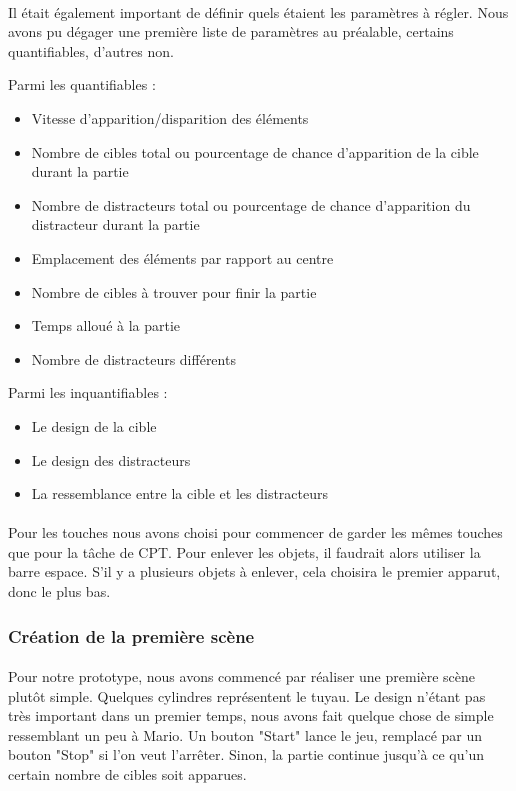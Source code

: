 \paragraph{}Il était également important de définir quels étaient les paramètres à régler. Nous avons pu dégager une première liste de paramètres au préalable, certains
quantifiables, d'autres non.

Parmi les quantifiables :
\begin{itemize}
    \item Vitesse d'apparition/disparition des éléments
    \item Nombre de cibles total ou pourcentage de chance d'apparition de la cible durant la partie
    \item Nombre de distracteurs total ou pourcentage de chance d'apparition du distracteur durant la partie
    \item Emplacement des éléments par rapport au centre
    \item Nombre de cibles à trouver pour finir la partie
    \item Temps alloué à la partie
    \item Nombre de distracteurs différents\\
\end{itemize}
Parmi les inquantifiables :
\begin{itemize}
    \item Le design de la cible
    \item Le design des distracteurs
    \item La ressemblance entre la cible et les distracteurs
\end{itemize}

\paragraph{}Pour les touches nous avons choisi pour commencer de garder les mêmes touches que pour la tâche de CPT. Pour enlever les objets, il faudrait alors utiliser la barre espace.
S'il y a plusieurs objets à enlever, cela choisira le premier apparut, donc le plus bas.

\subsubsection{Création de la première scène}

\paragraph{}Pour notre prototype, nous avons commencé par réaliser une première scène plutôt simple. Quelques cylindres représentent le tuyau. Le design n'étant pas très important
dans un premier temps, nous avons fait quelque chose de simple ressemblant un peu à Mario. Un bouton "Start" lance le jeu, remplacé par un bouton "Stop" si l'on veut l'arrêter. Sinon,
la partie continue jusqu'à ce qu'un certain nombre de cibles soit apparues. \\

